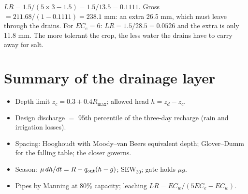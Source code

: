 \sol  $LR=1.5/(5\times3-1.5)=1.5/13.5=0.1111$. Gross $=211.68/(1-0.1111)=238.1$ mm: an extra 26.5 mm, which must leave through the drains. For $EC_e=6$: $LR=1.5/28.5=0.0526$ and the extra is only 11.8 mm. The more tolerant the crop, the less water the drains have to carry away for salt.


\section{Summary of the drainage layer}
\begin{itemize}
\item Depth limit $z_c=0.3+0.4R_{\max}$; allowed head $h=z_d-z_c$.
\item Design discharge $=$ 95th percentile of the three-day recharge (rain and irrigation losses).
\item Spacing: Hooghoudt with Moody--van Beers equivalent depth; Glover--Dumm for the falling table; the closer governs.
\item Season: $\mu\,dh/dt=R-q_{\rm out}(h-g)$; $\mathrm{SEW}_{30}$; gate holds $\mu g$.
\item Pipes by Manning at 80\% capacity; leaching $LR=EC_w/(5EC_e-EC_w)$.
\end{itemize}
